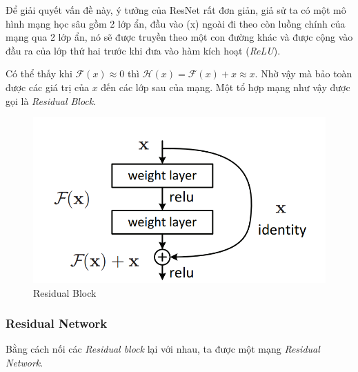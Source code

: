 \documentclass[a4paper, 12pt]{article}
\begin{document}
Để giải quyết vấn đề này, ý tưởng của ResNet rất đơn giản, giả sử ta có một mô hình mạng học sâu gồm 2 lớp ẩn, đầu vào (x) ngoài đi theo còn luồng chính của mạng qua 2 lớp ẩn, nó sẽ được truyền theo một con đường khác và được cộng vào đầu ra của lớp thứ hai trước khi đưa vào hàm kích hoạt (\textit{ReLU}). 

Có thể thấy khi $\mathcal{F}(x)\approx 0$ thì $\mathcal{H}(x)=\mathcal{F}(x)+ x \approx x$. Nhờ vậy mà bảo toàn được các giá trị của $x$ đến các lớp sau của mạng. Một tổ hợp mạng như vậy được gọi là \textit{Residual Block}.

\begin{figure}[H]
    \begin{center}
        \includegraphics[scale=0.5]{img/res-block}
        \caption{Residual Block}
    \end{center}
\end{figure}

\subsubsection{Residual Network}
Bằng cách nối các \textit{Residual block} lại với nhau, ta được một mạng \textit{Residual Network}.
\end{document}
